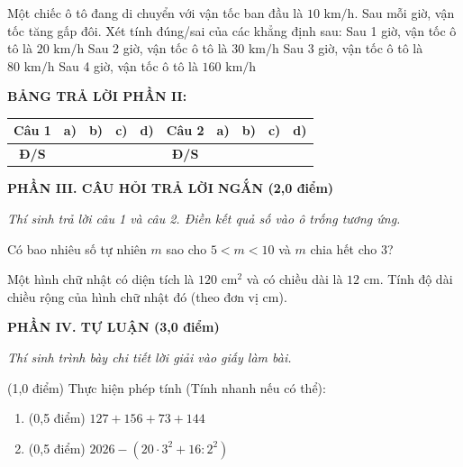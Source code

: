 \documentclass[12pt,a4paper]{article}
\begin{document}
\begin{ex}
Một chiếc ô tô đang di chuyển với vận tốc ban đầu là $10\text{ km/h}$. Sau mỗi giờ, vận tốc tăng gấp đôi. Xét tính đúng/sai của các khẳng định sau:
\choiceTF
{\True Sau 1 giờ, vận tốc ô tô là $20\text{ km/h}$}
{Sau 2 giờ, vận tốc ô tô là $30\text{ km/h}$}
{\True Sau 3 giờ, vận tốc ô tô là $80\text{ km/h}$}
{\True Sau 4 giờ, vận tốc ô tô là $160\text{ km/h}$}
\end{ex}


\noindent\textbf{BẢNG TRẢ LỜI PHẦN II:}
\begin{center}
\begin{tabular}{|c|c|c|c|c||c|c|c|c|c|}
\hline
\textbf{Câu 1} & \textbf{a)} & \textbf{b)} & \textbf{c)} & \textbf{d)} & \textbf{Câu 2} & \textbf{a)} & \textbf{b)} & \textbf{c)} & \textbf{d)} \\
\hline
\textbf{Đ/S} & \rule{0pt}{0.6cm} & & & & \textbf{Đ/S} & & & & \\
\hline
\end{tabular}
\end{center}
\vspace{2mm}

\setcounter{ex}{0}
\noindent\textbf{\large PHẦN III. CÂU HỎI TRẢ LỜI NGẮN (2,0 điểm)}

\textit{Thí sinh trả lời câu 1 và câu 2. Điền kết quả số vào ô trống tương ứng.}

\vspace{1mm}
\begin{ex}
Có bao nhiêu số tự nhiên $m$ sao cho $5 < m < 10$ và $m$ chia hết cho 3? 
\end{ex}

\begin{ex}
Một hình chữ nhật có diện tích là $120\text{ cm}^2$ và có chiều dài là $12\text{ cm}$. Tính độ dài chiều rộng của hình chữ nhật đó (theo đơn vị $\text{cm}$). 
\end{ex}


\setcounter{ex}{0}
\noindent\textbf{\large PHẦN IV. TỰ LUẬN (3,0 điểm)}

\textit{Thí sinh trình bày chi tiết lời giải vào giấy làm bài.}

\vspace{1mm}
\begin{ex} (1,0 điểm)
Thực hiện phép tính (Tính nhanh nếu có thể):
\begin{enumerate}[label=\textbf{\alph*)}, leftmargin=0.8cm, itemsep=2pt]
\item (0,5 điểm) $127 + 156 + 73 + 144$
\item (0,5 điểm) $2026 - (20 \cdot 3^2 + 16 : 2^2)$
\end{enumerate}
\end{ex}
\vspace{1.5mm}
\end{document}

